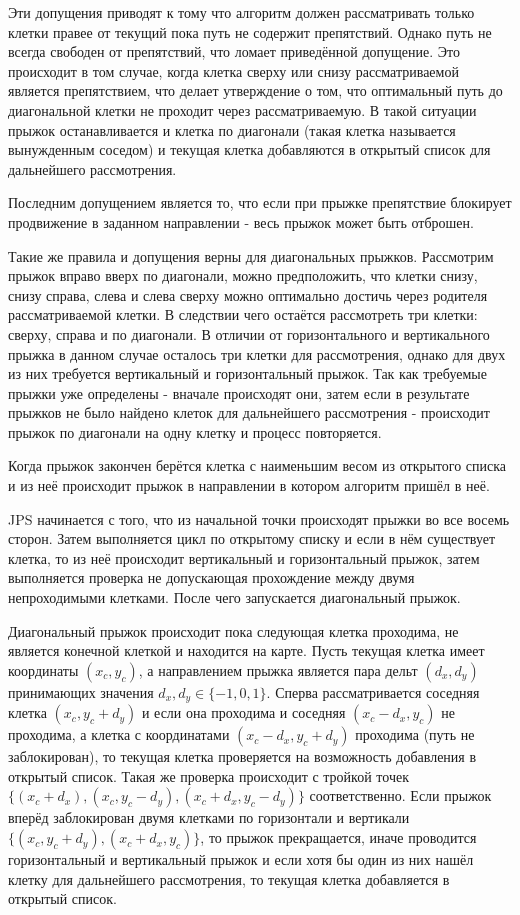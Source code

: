 Эти допущения приводят к тому что алгоритм должен рассматривать только клетки правее от текущий пока путь не содержит препятствий. Однако путь не всегда свободен от препятствий, что ломает приведённой допущение. Это происходит в том случае, когда клетка сверху или снизу рассматриваемой является препятствием, что делает утверждение о том, что оптимальный путь до диагональной клетки не проходит через рассматриваемую. В такой ситуации прыжок останавливается и клетка по диагонали (такая клетка называется вынужденным соседом) и текущая клетка добавляются в открытый список для дальнейшего рассмотрения. 

Последним допущением является то, что если при прыжке препятствие блокирует продвижение в заданном направлении - весь прыжок может быть отброшен.

Такие же правила и допущения верны для диагональных прыжков. Рассмотрим прыжок вправо вверх по диагонали, можно предположить, что клетки снизу, снизу справа, слева и слева сверху можно оптимально достичь через родителя рассматриваемой клетки. В следствии  чего остаётся рассмотреть три клетки: сверху, справа и по диагонали. В отличии от горизонтального и вертикального прыжка в данном случае осталось три клетки для рассмотрения, однако для двух из них требуется вертикальный и горизонтальный прыжок. Так как требуемые прыжки уже определены - вначале происходят они, затем если в результате прыжков не было найдено клеток для дальнейшего рассмотрения - происходит прыжок по диагонали на одну клетку и процесс повторяется.

Когда прыжок закончен берётся клетка с наименьшим весом из открытого списка и из неё происходит прыжок в направлении в котором алгоритм пришёл в неё.

JPS начинается с того, что из начальной точки происходят прыжки во все восемь сторон. Затем выполняется цикл по открытому списку и если в нём существует клетка, то из неё происходит вертикальный и горизонтальный прыжок, затем выполняется проверка не допускающая прохождение между двумя непроходимыми клетками. После чего запускается диагональный прыжок. 

Диагональный прыжок происходит пока следующая клетка проходима, не является конечной клеткой и находится на карте. Пусть текущая клетка имеет координаты ${(x_c, y_c)}$, а направлением прыжка является пара дельт ${(d_x, d_y)}$ принимающих значения ${d_x, d_y \in \{-1, 0, 1\}}$. Сперва рассматривается соседняя клетка ${(x_c, y_c+d_y)}$ и если она проходима и соседняя  ${(x_c-d_x, y_c)}$ не проходима, а клетка с координатами ${(x_c-d_x, y_c+d_y)}$ проходима (путь не заблокирован), то текущая клетка проверяется на возможность добавления в открытый список. Такая же проверка происходит с тройкой точек ${\{(x_c+d_x), (x_c, y_c-d_y), (x_c+d_x, y_c-d_y)\}}$ соответственно. Если прыжок вперёд заблокирован двумя клетками по горизонтали и вертикали ${\{(x_c, y_c+d_y), (x_c+d_x, y_c)\}}$, то прыжок прекращается, иначе проводится горизонтальный и вертикальный прыжок и если хотя бы один из них нашёл клетку для дальнейшего рассмотрения, то текущая клетка добавляется в открытый список.
  
